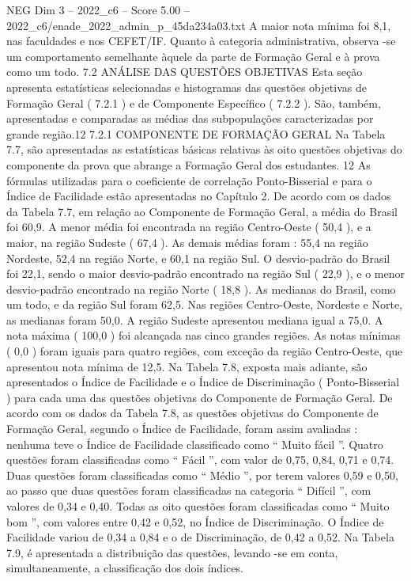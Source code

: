 \begin{textsample}{NEG Dim 3 – 2022\_c6 – Score 5.00 – 2022\_c6/enade\_2022\_admin\_p\_45da234a03.txt}
A maior nota mínima foi 8,1, nas faculdades e nos CEFET/IF.
Quanto à categoria administrativa, observa -se um comportamento semelhante àquele da parte de Formação Geral e à prova como um todo. 7.2 ANÁLISE DAS QUESTÕES OBJETIVAS Esta seção apresenta estatísticas selecionadas e histogramas das questões objetivas de Formação Geral ( 7.2.1 ) e de Componente Específico ( 7.2.2 ).
São, também, apresentadas e comparadas as médias das subpopulações caracterizadas por grande região.12 7.2.1 COMPONENTE DE FORMAÇÃO GERAL Na Tabela 7.7, são apresentadas as estatísticas básicas relativas às oito questões objetivas do componente da prova que abrange a Formação Geral dos estudantes. 12 As fórmulas utilizadas para o coeficiente de correlação Ponto-Bisserial e para o Índice de Facilidade estão apresentadas no Capítulo 2.
De acordo com os dados da Tabela 7.7, em relação ao Componente de Formação Geral, a média do Brasil foi 60,9.
A menor média foi encontrada na região Centro-Oeste ( 50,4 ), e a maior, na região Sudeste ( 67,4 ).
As demais médias foram : 55,4 na região Nordeste, 52,4 na região Norte, e 60,1 na região Sul.
O desvio-padrão do Brasil foi 22,1, sendo o maior desvio-padrão encontrado na região Sul ( 22,9 ), e o menor desvio-padrão encontrado na região Norte ( 18,8 ).
As medianas do Brasil, como um todo, e da região Sul foram 62,5.
Nas regiões Centro-Oeste, Nordeste e Norte, as medianas foram 50,0.
A região Sudeste apresentou mediana igual a 75,0.
A nota máxima ( 100,0 ) foi alcançada nas cinco grandes regiões.
As notas mínimas ( 0,0 ) foram iguais para quatro regiões, com exceção da região Centro-Oeste, que apresentou nota mínima de 12,5.
Na Tabela 7.8, exposta mais adiante, são apresentados o Índice de Facilidade e o Índice de Discriminação ( Ponto-Bisserial ) para cada uma das questões objetivas do Componente de Formação Geral.
De acordo com os dados da Tabela 7.8, as questões objetivas do Componente de Formação Geral, segundo o Índice de Facilidade, foram assim avaliadas : nenhuma teve o Índice de Facilidade classificado como “ Muito fácil ”.
Quatro questões foram classificadas como “ Fácil ”, com valor de 0,75, 0,84, 0,71 e 0,74.
Duas questões foram classificadas como “ Médio ”, por terem valores 0,59 e 0,50, ao passo que duas questões foram classificadas na categoria “ Difícil ”, com valores de 0,34 e 0,40.
Todas as oito questões foram classificadas como “ Muito bom ”, com valores entre 0,42 e 0,52, no Índice de Discriminação.
O Índice de Facilidade variou de 0,34 a 0,84 e o de Discriminação, de 0,42 a 0,52.
Na Tabela 7.9, é apresentada a distribuição das questões, levando -se em conta, simultaneamente, a classificação dos dois índices.

\end{textsample}
